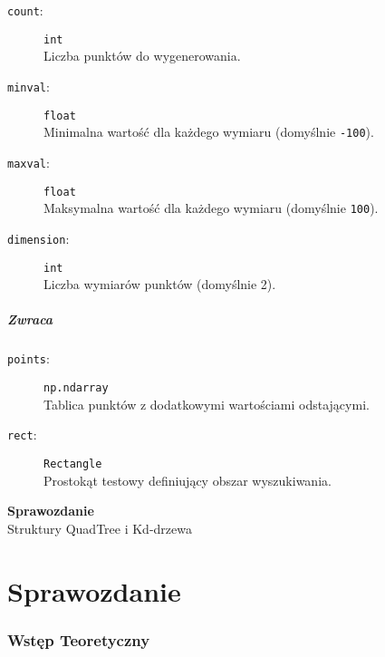 \documentclass[12pt]{article}
\begin{document}
\begin{description}
    \item[\texttt{count}:] \texttt{int} \\
    Liczba punktów do wygenerowania.
    
    \item[\texttt{minval}:] \texttt{float} \\
    Minimalna wartość dla każdego wymiaru (domyślnie \texttt{-100}).
    
    \item[\texttt{maxval}:] \texttt{float} \\
    Maksymalna wartość dla każdego wymiaru (domyślnie \texttt{100}).
    
    \item[\texttt{dimension}:] \texttt{int} \\
    Liczba wymiarów punktów (domyślnie 2).
\end{description}

\subsubsection{Zwraca}

\begin{description}
    \item[\texttt{points}:] \texttt{np.ndarray} \\
    Tablica punktów z dodatkowymi wartościami odstającymi.
    
    \item[\texttt{rect}:] \texttt{Rectangle} \\
    Prostokąt testowy definiujący obszar wyszukiwania.
\end{description}

\newpage
\thispagestyle{empty} %
\vspace*{\fill} %
\begin{center}
    {\textbf{\Huge Sprawozdanie} \\ 
    \LARGE Struktury QuadTree i Kd-drzewa \\ }
\end{center}
\vspace*{\fill} %

\newpage
\part{Sprawozdanie}
\pagestyle{sprawozdanie}
\section{Wstęp Teoretyczny}
\end{document}

